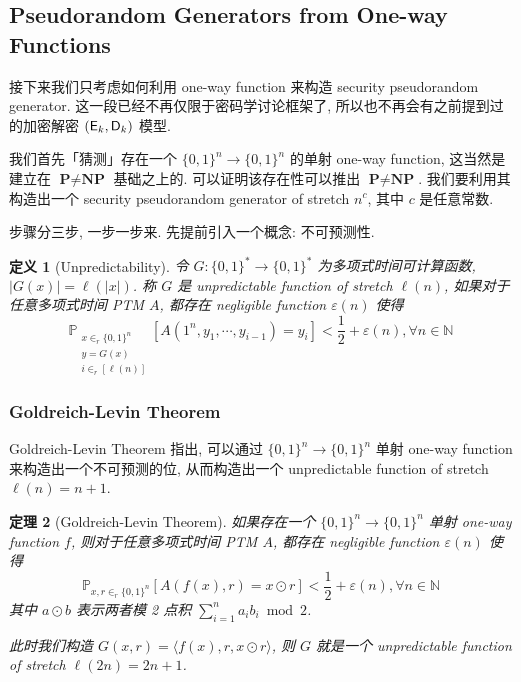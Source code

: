 \documentclass[8pt]{article}
\theoremstyle{compact}
\newtheorem{theorem}{定理}[section]
\newtheorem{definition}[theorem]{定义}
\def\P{\textbf{P}}
\def\NP{\textbf{NP}}
\begin{document}
\subsection{Pseudorandom Generators from One-way Functions}

接下来我们只考虑如何利用 one-way function 来构造 security pseudorandom generator. 这一段已经不再仅限于密码学讨论框架了, 所以也不再会有之前提到过的加密解密 $(\textsf E_k, \textsf D_k)$ 模型.

我们首先「猜测」存在一个 $\{0, 1\}^n \to \{0, 1\}^n$ 的单射 one-way function, 这当然是建立在 $\P \neq \NP$ 基础之上的. 可以证明该存在性可以推出 $\P \neq \NP$. 我们要利用其构造出一个 security pseudorandom generator of stretch $n^c$, 其中 $c$ 是任意常数.

步骤分三步, 一步一步来. 先提前引入一个概念: 不可预测性.

\begin{definition}[Unpredictability]
	令 $G: \{0, 1\}^* \to \{0, 1\}^*$ 为多项式时间可计算函数, $|G(x)| = \ell(|x|)$. 称 $G$ 是 unpredictable function of stretch $\ell(n)$, 如果对于任意多项式时间 PTM $A$, 都存在 negligible function $\varepsilon(n)$ 使得 $$\mathbb P_{\substack{x \in_r \{0, 1\}^n \\ y = G(x) \\ i \in_r [\ell(n)]}}[A(1^n, y_1, \cdots, y_{i-1}) = y_i] < \frac12 + \varepsilon(n), \forall n \in \mathbb N$$
\end{definition}

\subsubsection{Goldreich-Levin Theorem}

Goldreich-Levin Theorem 指出, 可以通过 $\{0, 1\}^n \to \{0, 1\}^n$ 单射 one-way function 来构造出一个不可预测的位, 从而构造出一个 unpredictable function of stretch $\ell(n) = n + 1$.

\begin{theorem}[Goldreich-Levin Theorem]
	如果存在一个 $\{0, 1\}^n \to \{0, 1\}^n$ 单射 one-way function $f$, 则对于任意多项式时间 PTM $A$, 都存在 negligible function $\varepsilon(n)$ 使得 $$\mathbb P_{x, r \in_r \{0, 1\}^n }[A(f(x), r) = x \odot r] < \frac12 + \varepsilon(n), \forall n \in \mathbb N$$ 其中 $a \odot b$ 表示两者模 2 点积 $\sum_{i=1}^{n}a_ib_i \bmod 2$.
	\label{Goldreich-Levin}
\end{theorem}

\textit{此时我们构造 $G(x, r) = \langle f(x), r, x \odot r \rangle$, 则 $G$ 就是一个 unpredictable function of stretch $\ell(2n) = 2n + 1$.}
\end{document}
